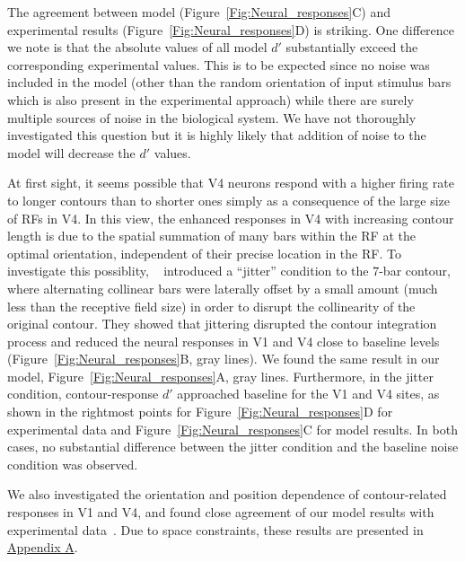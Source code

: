 The agreement between model (Figure~\ref{Fig:Neural_responses}C) and
experimental results (Figure~\ref{Fig:Neural_responses}D) is striking.
One difference we note is that the absolute values of all model $d'$
substantially exceed the corresponding experimental values. This is to be expected since no noise was included in the model (other than the random orientation of input stimulus bars which is also present in the experimental approach) while there are surely multiple sources of noise in the biological system. We have not thoroughly investigated this question but it is highly likely that addition of noise to the model will decrease the $d'$ values.

At first sight, it seems possible that V4 neurons respond with a higher firing rate to longer contours than to shorter ones simply as a consequence of the large size of RFs in V4. In this view, the enhanced responses in V4 with increasing contour length is due to the spatial summation of many bars within the RF at the optimal orientation, independent of their precise location in the RF. To investigate this possiblity, ~\cite{Chen_etal14} introduced a ``jitter'' condition to the 7-bar contour, where alternating collinear bars were laterally offset by a small amount (much less than the receptive field size) in order to disrupt the collinearity of the original contour. They showed that jittering disrupted the contour integration process and reduced the neural responses in V1 and V4 close to baseline levels (Figure~\ref{Fig:Neural_responses}B, gray lines). We found the same result in our model, Figure~\ref{Fig:Neural_responses}A, gray lines.  Furthermore, in the jitter condition, contour-response $d'$ approached baseline for the V1 and V4 sites, as shown in the rightmost points for
Figure~\ref{Fig:Neural_responses}D for experimental data and
Figure~\ref{Fig:Neural_responses}C for model results. In both cases,
no substantial difference between the jitter condition and the
baseline noise condition was observed.

We also investigated the orientation and position dependence of contour-related responses in V1 and V4, and found close agreement of
our model results with experimental data~\citep{Chen_etal14}. Due to space constraints, these results are presented in \hyperref[sec:appendix_fig]{Appendix A}.

